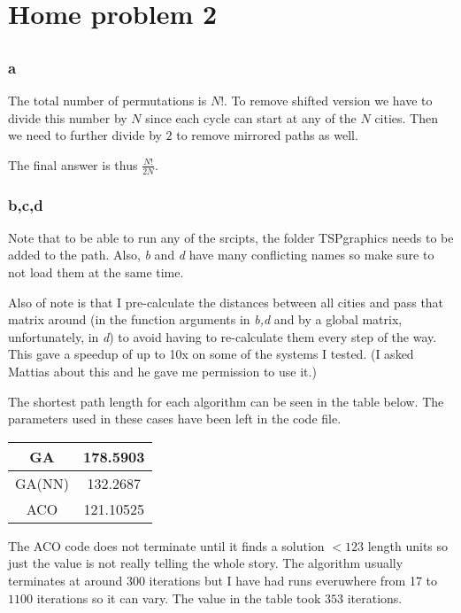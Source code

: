 \documentclass{article}
\begin{document}
\section*{Home problem 2}

\setcounter{section}{2}
\subsection{}
\subsubsection*{a}

The total number of permutations is $N!$. To remove shifted version we have to
divide this number by $N$ since each cycle can start at any of the $N$ cities.
Then we need to further divide by $2$ to remove mirrored paths as well.

The final answer is thus $\frac{N!}{2N}$.

\subsubsection*{b,c,d}

Note that to be able to run any of the srcipts, the folder TSPgraphics needs to
be added to the path. Also, \emph{b} and \emph{d} have many conflicting names
so make sure to not load them at the same time.

Also of note is that I pre-calculate the distances between all cities and pass
that matrix around (in the function arguments in \emph{b,d} and by a global
matrix, unfortunately, in \emph{d}) to avoid having to re-calculate them every
step of the way.  This gave a speedup of up to 10x on some of the systems I
tested. (I asked Mattias about this and he gave me permission to use it.)

The shortest path length for each algorithm can be seen in the table below. The
parameters used in these cases have been left in the code file.

\begin{center}
  \begin{tabular}{| c | c |}
    \hline
    GA & 178.5903 \\
    \hline
    GA(NN) & 132.2687 \\
    \hline
    ACO & 121.10525 \\
    \hline
  \end{tabular}
\end{center}

The ACO code does not terminate until it finds a solution $< 123$ length units
so just the value is not really telling the whole story. The algorithm usually
terminates at around $300$ iterations but I have had runs everuwhere from 17 to
$1100$ iterations so it can vary. The value in the table took $353$ iterations.
\end{document}
